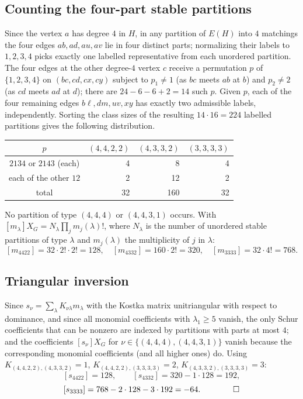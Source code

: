 \documentclass[11pt]{article}
\theoremstyle{remark}
\newcommand{\csf}{X}
\begin{document}
\subsection{Counting the four-part stable partitions}

Since the vertex $a$ has degree $4$ in $H$, in any partition of $E(H)$ into
$4$ matchings the four edges $ab, ad, au, av$ lie in four distinct parts;
normalizing their labels to $1, 2, 3, 4$ picks exactly one labelled
representative from each unordered partition. The four edges at the other
degree-$4$ vertex $c$ receive a permutation $p$ of $\{1,2,3,4\}$ on
$(bc, cd, cx, cy)$ subject to $p_1 \ne 1$ (as $bc$ meets $ab$ at $b$) and
$p_2 \ne 2$ (as $cd$ meets $ad$ at $d$); there are
$24 - 6 - 6 + 2 = 14$ such $p$. Given $p$, each of the four remaining
edges $b\ell, dm, uv, xy$ has exactly two admissible labels, independently.
Sorting the class sizes of the resulting $14 \cdot 16 = 224$ labelled
partitions gives the following distribution.
\begin{center}
\begin{tabular}{c|rrr}
$p$ & $(4,4,2,2)$ & $(4,3,3,2)$ & $(3,3,3,3)$ \\ \hline
$2134$ or $2143$ (each) & 4 & 8 & 4 \\
each of the other $12$ & 2 & 12 & 2 \\ \hline
total & 32 & 160 & 32
\end{tabular}
\end{center}
No partition of type $(4,4,4)$ or $(4,4,3,1)$ occurs. With
$[m_\lambda]\csf_G = N_\lambda \prod_j m_j(\lambda)!$, where $N_\lambda$ is
the number of unordered stable partitions of type $\lambda$ and
$m_j(\lambda)$ the multiplicity of $j$ in $\lambda$:
\[
[m_{4422}] = 32 \cdot 2! \cdot 2! = 128, \quad
[m_{4332}] = 160 \cdot 2! = 320, \quad
[m_{3333}] = 32 \cdot 4! = 768 .
\]

\subsection{Triangular inversion}

Since $s_\nu = \sum_\lambda K_{\nu\lambda} m_\lambda$ with the Kostka matrix
unitriangular with respect to dominance, and since all monomial
coefficients with $\lambda_1 \ge 5$ vanish, the only Schur coefficients that
can be nonzero are indexed by partitions with parts at most $4$; and the
coefficients $[s_\nu]\csf_G$ for
$\nu \in \{(4,4,4), (4,4,3,1)\}$ vanish because the corresponding monomial
coefficients (and all higher ones) do. Using
$K_{(4,4,2,2),(4,3,3,2)} = 1$, $K_{(4,4,2,2),(3,3,3,3)} = 2$,
$K_{(4,3,3,2),(3,3,3,3)} = 3$:
\[
[s_{4422}] = 128, \qquad
[s_{4332}] = 320 - 1 \cdot 128 = 192,
\]
\[
[s_{3333}] = 768 - 2 \cdot 128 - 3 \cdot 192 = -64 . \qquad \qed
\]
\end{document}
